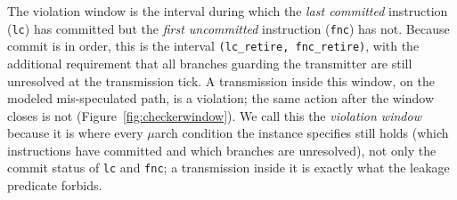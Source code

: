 The violation window
\notebr
is the interval during which the \emph{last committed} instruction (\texttt{lc}) has committed but the \emph{first uncommitted} instruction (\texttt{fnc}) has not. Because commit is in order, this is the interval \texttt{(lc\_retire, fnc\_retire)}, with the additional requirement that all branches guarding the transmitter are still unresolved at the transmission tick.
\notebr
{}
\notebr
A transmission inside this window, on the modeled mis-speculated path, is a violation;
\urgentbr
{}
\notebr
the same action after the window closes is not (Figure~\ref{fig:checkerwindow}).
We call this the \emph{violation window} because it is where every $\mu$arch condition the instance specifies still holds (which instructions have committed and which branches are unresolved), not only the commit status of \texttt{lc} and \texttt{fnc}; a transmission inside it is exactly what the leakage predicate forbids.


